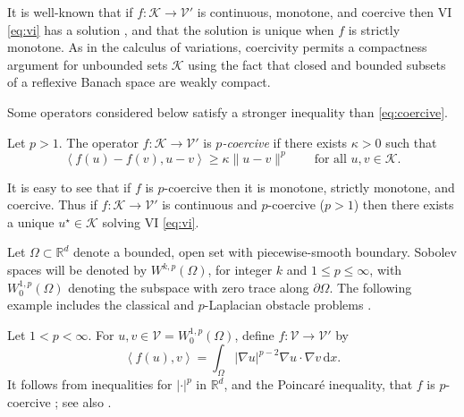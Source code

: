 \documentclass[review,hidelinks,onefignum,onetabnum,final]{siamart220329}  %
\newcommand{\RR}{\mathbb{R}}
\newcommand{\grad}{\nabla}
\newcommand{\cK}{\mathcal{K}}
\newcommand{\cV}{\mathcal{V}}
\newcommand{\ip}[2]{\left<#1,#2\right>}
\newcommand{\dx}{\, \mathrm{d}x}
\begin{document}
It is well-known that if $f:\cK \to \cV'$ is continuous, monotone, and coercive then VI \eqref{eq:vi} has a solution \cite[Corollary III.1.8]{KinderlehrerStampacchia1980}, and that the solution is unique when $f$ is strictly monotone.  As in the calculus of variations, coercivity permits a compactness argument for unbounded sets $\cK$ using the fact that closed and bounded subsets of a reflexive Banach space are weakly compact.

Some operators considered below satisfy a stronger inequality than \eqref{eq:coercive}.

\begin{definition}  Let $p>1$.  The operator $f:\cK \to \cV'$ is \emph{$p$-coercive} if there exists $\kappa>0$ such that
\begin{equation}
\ip{f(u)-f(v)}{u-v} \ge \kappa \|u-v\|^p \qquad \text{for all } u,v \in \cK. \label{eq:pcoercive}
\end{equation}
\end{definition}

It is easy to see that if $f$ is $p$-coercive then it is monotone, strictly monotone, and coercive.  Thus if $f:\cK \to \cV'$ is continuous and $p$-coercive ($p>1$) then there exists a unique $u^\star\in \cK$ solving VI \eqref{eq:vi}.

Let $\Omega \subset \RR^d$ denote a bounded, open set with piecewise-smooth boundary.  Sobolev spaces \cite{Evans2010} will be denoted by $W^{k,p}(\Omega)$, for integer $k$ and $1\le p \le \infty$, with $W^{1,p}_0(\Omega)$ denoting the subspace with zero trace along $\partial\Omega$.  The following example includes the classical and $p$-Laplacian obstacle problems \cite{ChoeLewis1991}.

\begin{example}  \label{ex:plaplacian}  Let $1<p<\infty$.  For $u,v \in \cV = W^{1,p}_0(\Omega)$, define $f:\cV \to \cV'$ by
\begin{equation}
\ip{f(u)}{v} = \int_\Omega |\grad u|^{p-2} \grad u \cdot \grad v\dx. \label{eq:plaplacian}
\end{equation}
It follows from inequalities for $|\cdot|^p$ in $\RR^d$, and the Poincar\'e inequality, that $f$ is $p$-coercive \cite{ChoeLewis1991}; see also \cite[Appendix A]{Bueler2021conservation}.  \end{example}
\end{document}
